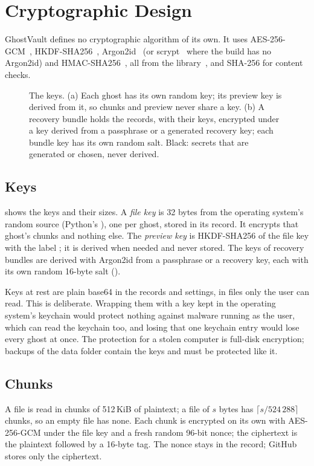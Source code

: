 \section{Cryptographic Design}\label{sec:crypto}

GhostVault defines no cryptographic algorithm of its own. It uses AES-256-GCM~\cite{nist-gcm},
HKDF-SHA256~\cite{rfc5869}, Argon2id~\cite{rfc9106} (or scrypt~\cite{rfc7914} where the
 build has no Argon2id) and HMAC-SHA256~\cite{rfc2104}, all from the
 library~\cite{pyca}, and SHA-256 for content checks.

\begin{figure}[t]
\centering

\caption{The keys. (a) Each ghost has its own random key; its preview key is derived from it, so
chunks and preview never share a key. (b) A recovery bundle holds the records, with their keys,
encrypted under a key derived from a passphrase or a generated recovery key; each bundle key has
its own random salt. Black: secrets that are generated or chosen, never derived.}
\label{fig:keys}
\end{figure}

\subsection{Keys}\label{sec:keys}
 shows the keys and  their sizes. A \emph{file key} is 32 bytes
from the operating system's random source (Python's ), one per ghost, stored in
its record. It encrypts that ghost's chunks and nothing else. The \emph{preview key} is
HKDF-SHA256 of the file key with the label ; it is derived when
needed and never stored. The keys of recovery bundles are derived with Argon2id from a passphrase
or a recovery key, each with its own random 16-byte salt ().

Keys at rest are plain base64 in the records and settings, in files only the user can read. This is
deliberate. Wrapping them with a key kept in the operating system's keychain would protect nothing
against malware running as the user, which can read the keychain too, and losing that one keychain
entry would lose every ghost at once. The protection for a stolen computer is full-disk encryption;
backups of the data folder contain the keys and must be protected like it.

\subsection{Chunks}\label{sec:chunks}
A file is read in chunks of 512\,KiB of plaintext; a file of $s$ bytes has $\lceil s/524\,288
\rceil$ chunks, so an empty file has none. Each chunk is encrypted on its own with AES-256-GCM
under the file key and a fresh random 96-bit nonce; the ciphertext is the plaintext followed by a
16-byte tag. The nonce stays in the record; GitHub stores only the ciphertext.

